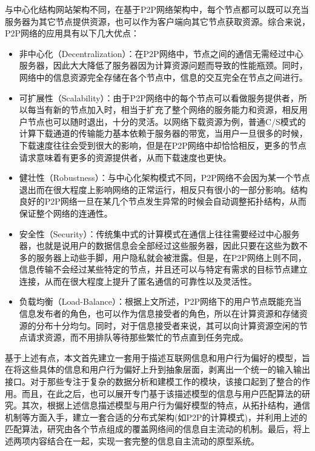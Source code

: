 与中心化结构网站架构不同，在基于P2P网络架构中，每个节点都可以既可以充当服务器为其它节点提供资源，也可以作为客户端向其它节点获取资源。综合来说，P2P网络的应用具有以下几大优点\cite{罗杰文2005peer}：

\begin{itemize}
\item 非中心化（Decentralization）：在P2P网络中，节点之间的通信无需经过中心服务器，因此大大降低了服务器因为计算资源问题而导致的性能瓶颈。同时，网络中的信息资源完全存储在各个节点中，信息的交互完全在节点之间进行。
\item 可扩展性（Scalability）：由于P2P网络中的每个节点可以看做服务提供者，所以每当有新的节点加入时，相当于扩充了整个网络的服务能力和资源，相反用户节点也可以随时退出，十分的灵活。以网络下载资源为例，普通C/S模式的计算下载通道的传输能力基本依赖于服务器的带宽，当用户一旦很多的时候，下载速度往往会受到很大的影响，但是在P2P网络中却恰恰相反，更多的节点请求意味着有更多的资源提供者，从而下载速度也更快。
\item 健壮性（Robustness）：与中心化架构模式不同，P2P网络不会因为某一个节点退出而在很大程度上影响网络的正常运行，相反只有很小的一部分影响。结构良好的P2P网络一旦在某几个节点发生异常的时候会自动调整拓扑结构，从而保证整个网络的连通性。
\item 安全性（Security）：传统集中式的计算模式在通信上往往需要经过中心服务器，也就是说用户的数据信息会全部经过这些服务器，因此只要在这些为数不多的服务器上动些手脚，用户隐私就会被泄露。但是，在P2P网络上则不同，信息传输不会经过某些特定的节点，并且还可以与特定有需求的目标节点建立连接，从而在很大程度上提升了匿名通信的可靠性以及灵活性。
\item 负载均衡（Load-Balance）：根据上文所述，P2P网络下的用户节点既能充当信息发布者的角色，也可以作为信息接受者的角色，所以在计算资源和存储资源的分布十分均匀。同时，对于信息接受者来说，其可以向计算资源空闲的节点请求资源，而不用排队等待那些繁忙的节点直到任务完成。
\end{itemize}

基于上述有点，本文首先建立一套用于描述互联网信息和用户行为偏好的模型，旨在将这些具体的信息和用户行为偏好上升到抽象层面，剥离出一个统一的输入输出接口。对于那些专注于复杂的数据分析和建模工作的模块，该接口起到了整合的作用。而且，在此之后，也可以展开专门基于该描述模型的信息与用户匹配算法的研究。其次，根据上述信息描述模型与用户行为偏好模型的特点，从拓扑结构，通信机制等方面入手，建立一套合适的分布式架构(如P2P的计算模式)，并利用上述的匹配算法，研究由各个节点组成的覆盖网络间的信息自主流动的机制。最后，将上述两项内容结合在一起，实现一套完整的信息自主流动的原型系统。


